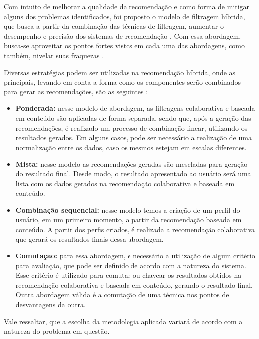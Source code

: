 Com intuito de melhorar a qualidade da recomendação e como forma de mitigar alguns dos problemas identificados, foi proposto o modelo de filtragem híbrida, que busca a partir da combinação das técnicas de filtragem, aumentar o desempenho e precisão dos sistemas de recomendação \cite{goksedef2010}. Com essa abordagem, busca-se aproveitar os pontos fortes vistos em cada uma das abordagens, como também, nivelar suas fraquezas \cite{al2008}. 

Diversas estratégias podem ser utilizadas na recomendação híbrida, onde as principais, levando em conta a forma como os componentes serão combinados para gerar as recomendações, são as seguintes  \cite{barbosa2014}:

\begin{itemize}
    \item \textbf{Ponderada:} nesse modelo de abordagem, as filtragens colaborativa e baseada em conteúdo são aplicadas de forma separada, sendo que, após a geração das recomendações, é realizado um processo de combinação linear, utilizando os resultados gerados. Em alguns casos, pode ser necessário a realização de uma normalização entre os dados, caso os mesmos estejam em escalas diferentes.
    
    \item \textbf{Mista:} nesse modelo as recomendações geradas são mescladas para geração do resultado final. Desde modo, o resultado apresentado ao usuário será uma lista com os dados gerados na recomendação colaborativa e baseada em conteúdo.
    
    \item \textbf{Combinação sequencial:} nesse modelo temos a criação de um perfil do usuário, em um primeiro momento, a partir da recomendação baseada em conteúdo. A partir dos perfis criados, é realizada a recomendação colaborativa que gerará os resultados finais dessa abordagem.
    
    \item \textbf{Comutação:} para essa abordagem, é necessário a utilização de algum critério para avaliação, que pode ser definido de acordo com a natureza do sistema. Esse critério é utilizado para comutar ou chavear os resultados obtidos na recomendação colaborativa e baseada em conteúdo, gerando o resultado final. Outra abordagem válida é a comutação de uma técnica nos pontos de desvantagens da outra.
\end{itemize}

Vale ressaltar, que a escolha da metodologia aplicada variará de acordo com a natureza do problema em questão.

